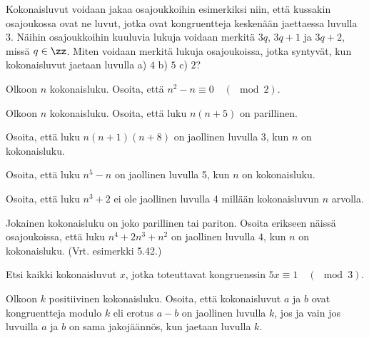 \begin{tehtavasivu}
\begin{tehtava}
	Kokonaisluvut voidaan jakaa osajoukkoihin esimerkiksi niin, että kussakin osajoukossa ovat ne luvut, jotka ovat kongruentteja keskenään jaettaessa luvulla 3. Näihin osajoukkoihin kuuluvia lukuja voidaan merkitä $3q$, $3q + 1$ ja $3q + 2$, missä $q \in \zz$. Miten voidaan merkitä lukuja osajoukoissa, jotka syntyvät, kun kokonaisluvut jaetaan luvulla a) $4$ b) $5$ c) $2$?
\end{tehtava}

\begin{tehtava}
	Olkoon $n$ kokonaisluku. Osoita, että $n^2 - n \equiv 0\quad (\mod 2)$.
\end{tehtava}

\begin{tehtava}
	Olkoon $n$ kokonaisluku. Osoita, että luku $n(n + 5)$ on parillinen.
\end{tehtava}

\begin{tehtava}
	Osoita, että luku $n(n + 1)(n + 8)$ on jaollinen luvulla 3, kun $n$ on kokonaisluku.
\end{tehtava}

\begin{tehtava}
	Osoita, että luku $n^5 - n$ on jaollinen luvulla 5, kun $n$ on kokonaisluku.
\end{tehtava}

\begin{tehtava}
	Osoita, että luku $n^3 + 2$ ei ole jaollinen luvulla 4 millään kokonaisluvun $n$ arvolla.
\end{tehtava}

\begin{tehtava}
	Jokainen kokonaisluku on joko parillinen tai pariton. Osoita erikseen näissä osajoukoissa, että luku $n^4 + 2n^3 + n^2$ on jaollinen luvulla $4$, kun $n$ on kokonaisluku. (Vrt. esimerkki 5.42.)
\end{tehtava}

\begin{tehtava}
	Etsi kaikki kokonaisluvut $x$, jotka toteuttavat kongruenssin $5x\equiv 1 \quad (\mod 3)$.
\end{tehtava}

\begin{tehtava}
	Olkoon $k$ positiivinen kokonaisluku. Osoita, että kokonaisluvut $a$ ja $b$ ovat kongruentteja modulo $k$ eli erotus $a-b$ on jaollinen luvulla $k$, jos ja vain jos luvuilla $a$ ja $b$ on sama jakojäännös, kun jaetaan luvulla $k$.
\end{tehtava}


\end{tehtavasivu}
